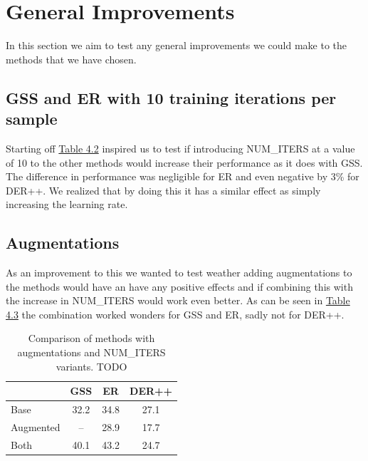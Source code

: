 \documentclass[oneside]{ctuthesis}
\begin{document}
\section{General Improvements}
\label{sec:exptwo}
In this section we aim to test any general improvements we could make to the methods that we have chosen.

\subsection{GSS and ER with 10 training iterations per sample}
Starting off \hyperref[tab:gss-ablation]{Table 4.2} inspired us to test if introducing NUM\_ITERS at a value of 10 to the other methods would increase their performance as it does with GSS. The difference in performance was negligible for ER and even negative by 3\% for DER++. We realized that by doing this it has a similar effect as simply increasing the learning rate.

\subsection{Augmentations}
As an improvement to this we wanted to test weather adding augmentations to the methods would have an have any positive effects and if combining this with the increase in NUM\_ITERS would work even better. As can be seen in \hyperref[tab:augment-comparison]{Table 4.3} the combination worked wonders for GSS and ER, sadly not for DER++.

\begin{table}[t]
\centering
\caption{Comparison of methods with augmentations and NUM\_ITERS variants. TODO}
\label{tab:augment-comparison}
\begin{tabular}{lccc}
\toprule
& \textbf{GSS} & \textbf{ER} & \textbf{DER++} \\
\midrule
Base & 32.2 & 34.8 & 27.1 \\
Augmented & -- & 28.9 & 17.7 \\
Both & 40.1 & 43.2 & 24.7 \\
\bottomrule
\end{tabular}
\end{table}
\end{document}
